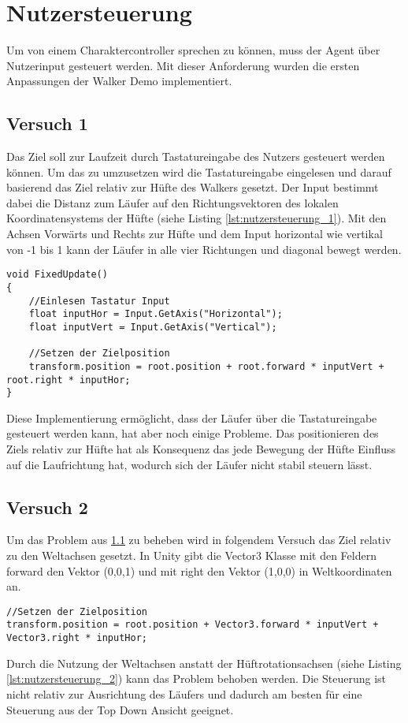 \section{Nutzersteuerung}
Um von einem Charaktercontroller sprechen zu können, muss der Agent über Nutzerinput gesteuert werden. Mit dieser Anforderung wurden die ersten Anpassungen der Walker Demo implementiert.

\subsection{Versuch 1}
\label{subsec:versuch_1}
Das Ziel soll zur Laufzeit durch Tastatureingabe des Nutzers gesteuert werden können.
Um das zu umzusetzen wird die Tastatureingabe eingelesen und darauf basierend das Ziel relativ zur Hüfte des Walkers gesetzt. Der Input bestimmt dabei die Distanz zum Läufer auf den Richtungsvektoren des lokalen Koordinatensystems der Hüfte (siehe Listing \ref{lst:nutzersteuerung_1}). Mit den Achsen Vorwärts und Rechts zur Hüfte und dem Input horizontal wie vertikal von -1 bis 1 kann der Läufer in alle vier Richtungen und diagonal bewegt werden.
\begin{lstlisting}[caption={Nutzersteuerung erster Prototyp},captionpos=b,label={lst:nutzersteuerung_1}]
void FixedUpdate()
{
    //Einlesen Tastatur Input
    float inputHor = Input.GetAxis("Horizontal");
    float inputVert = Input.GetAxis("Vertical");
        
    //Setzen der Zielposition
    transform.position = root.position + root.forward * inputVert + root.right * inputHor;
}
\end{lstlisting}
Diese Implementierung ermöglicht, dass der Läufer über die Tastatureingabe gesteuert werden kann, hat aber noch einige Probleme. Das positionieren des Ziels relativ zur Hüfte hat als Konsequenz das jede Bewegung der Hüfte Einfluss auf die Laufrichtung hat, wodurch sich der Läufer nicht stabil steuern lässt. 

\subsection{Versuch 2}
Um das Problem aus \ref{subsec:versuch_1} zu beheben wird in folgendem Versuch das Ziel relativ zu den Weltachsen gesetzt. In Unity gibt die Vector3 Klasse mit den Feldern forward den Vektor (0,0,1) und mit right den Vektor (1,0,0) in Weltkoordinaten an.
\begin{lstlisting}[caption={Nutzersteuerung berechnung mit Weltachsen},captionpos=b,label={lst:nutzersteuerung_2}]
//Setzen der Zielposition
transform.position = root.position + Vector3.forward * inputVert + Vector3.right * inputHor;
\end{lstlisting}
Durch die Nutzung der Weltachsen anstatt der Hüftrotationsachsen (siehe Listing \ref{lst:nutzersteuerung_2}) kann das Problem behoben werden. Die Steuerung ist nicht relativ zur Ausrichtung des Läufers und dadurch am besten für eine Steuerung aus der Top Down Ansicht geeignet.

